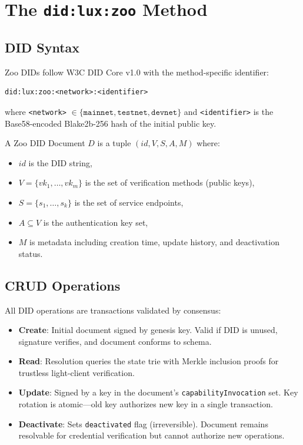 \section{The \texttt{did:lux:zoo}
 Method}

\subsection{DID Syntax}

Zoo DIDs follow W3C DID Core v1.0 \cite{w3c-did-core} with the method-specific identifier:

\begin{verbatim}
did:lux:zoo:<network>:<identifier>
\end{verbatim}

where \texttt{<network>} $\in \{\texttt{mainnet}, \texttt{testnet}, \texttt{devnet}\}$ and \texttt{<identifier>} is the Base58-encoded Blake2b-256 hash of the initial public key.

\begin{definition}
A Zoo DID Document $D$ is a tuple $(id, V, S, A, M)$ where:
\begin{itemize}
\item $id$ is the DID string,
\item $V = \{vk_1, \ldots, vk_m\}$ is the set of verification methods (public keys),
\item $S = \{s_1, \ldots, s_k\}$ is the set of service endpoints,
\item $A \subseteq V$ is the authentication key set,
\item $M$ is metadata including creation time, update history, and deactivation status.
\end{itemize}
\end{definition}

\subsection{CRUD Operations}

All DID operations are \IdentityVM{} transactions validated by consensus:

\begin{itemize}
\item \textbf{Create}: Initial document signed by genesis key. Valid if DID is unused, signature verifies, and document conforms to schema.
\item \textbf{Read}: Resolution queries the state trie with Merkle inclusion proofs for trustless light-client verification.
\item \textbf{Update}: Signed by a key in the document's \texttt{capabilityInvocation} set. Key rotation is atomic---old key authorizes new key in a single transaction.
\item \textbf{Deactivate}: Sets \texttt{deactivated} flag (irreversible). Document remains resolvable for credential verification but cannot authorize new operations.
\end{itemize}

